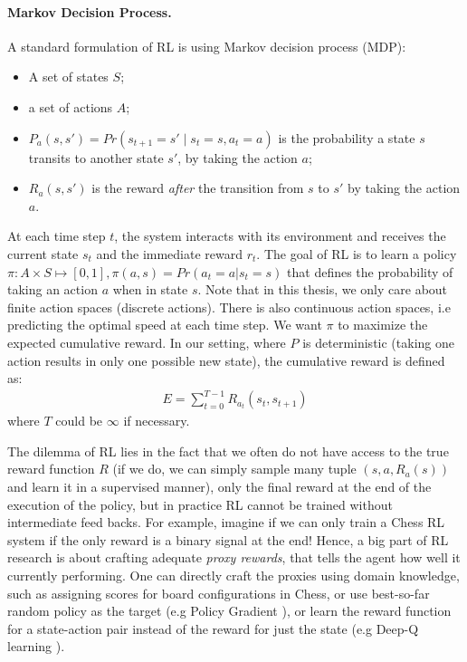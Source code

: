 \paragraph{Markov Decision Process.} A standard formulation of RL is using
Markov decision process (MDP):
\begin{itemize}
  \item A set of states $S$;
  \item a set of actions $A$;
  \item $P_a(s, s') = Pr(s_{t+1} = s' \mid s_t = s, a_t = a)$ is the probability
    a state $s$ transits to another state $s'$, by taking the action $a$;
  \item $R_a(s, s')$ is the reward \emph{after} the transition from $s$ to $s'$ by
    taking the action $a$.  
\end{itemize}
At each time step $t$, the system interacts with its environment and receives
the current state $s_t$ and the immediate reward $r_t$. The goal of RL is to
learn a policy $\pi: A \times S \mapsto [0, 1], \pi(a, s) = Pr(a_t=a|s_t=s)$
that defines the probability of taking an action $a$ when in state $s$. Note
that in this thesis, we only care about finite action spaces (discrete actions).
There is also continuous action spaces, i.e predicting the
optimal speed at each time step. We want $\pi$ to maximize the expected
cumulative reward. In our setting, where $P$ is deterministic (taking one action
results in only one possible new state), the cumulative
reward is defined as:
\begin{align}
  E = \sum_{t=0}^{T-1}{R_{a_t}(s_t, s_{t+1})}
\end{align}
where $T$ could be $\infty$ if necessary.

The dilemma of RL lies in the fact that we often do not have access to the true
reward function $R$ (if we do, we can simply sample many tuple $(s, a,
R_a(s))$ and learn it in a supervised manner), only the final reward at the
end of the execution of the policy, but in practice RL cannot be trained without
intermediate feed backs. For example, imagine if we can only train a Chess RL system if the
only reward is a binary signal at the end! Hence, a big part of RL research is
about crafting adequate \emph{proxy rewards}, that tells the agent how well
it currently performing. One can directly craft the proxies using domain
knowledge, such as assigning scores for board configurations in Chess, or use
best-so-far random policy as the target (e.g Policy Gradient \cite{reinforce}), or learn the reward
function for a state-action pair instead of the reward for just the state
(e.g Deep-Q learning \cite{deepq}).